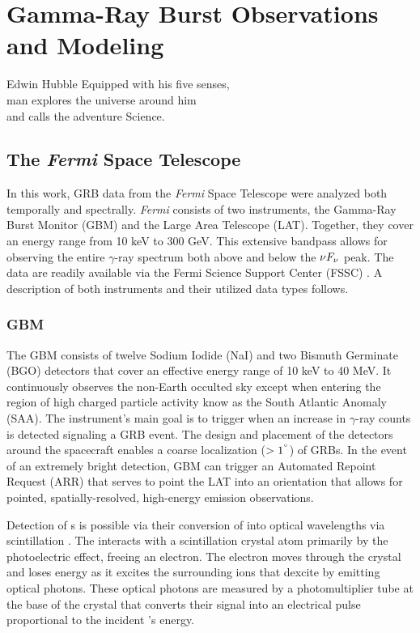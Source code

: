 \chapter{Gamma-Ray Burst Observations and Modeling}

\label{ch:obsGRB}
\begin{chapterquote}{Edwin Hubble}
  Equipped with his five senses,\\ man explores the universe around him\\
  and calls the adventure Science.
\end{chapterquote}

\section{The {\it Fermi} Space Telescope}
In this work, GRB data from the {\it Fermi} Space Telescope were
analyzed both temporally and spectrally. {\it Fermi} consists of two
instruments, the Gamma-Ray Burst Monitor (GBM) and the Large Area
Telescope (LAT). Together, they cover an energy range from 10 keV to
300 GeV. This extensive bandpass allows for observing the entire
$\gamma$-ray spectrum both above and below the $\nu F_{\nu}$ peak. The data
are readily available via the Fermi Science Support Center (FSSC)
\cite{fssc}. A description of both instruments and their utilized data
types follows.
\subsection{GBM}
The GBM consists of twelve Sodium Iodide (NaI) and two Bismuth
Germinate (BGO) detectors that cover an effective energy range of 10
keV to 40 MeV. It continuously observes the non-Earth occulted sky
except when entering the region of high charged particle activity know
as the South Atlantic Anomaly (SAA). The instrument's main goal is to
trigger when an increase in $\gamma$-ray counts is detected signaling
a GRB event. The design and placement of the detectors around the
spacecraft enables a coarse localization ($> 1^{\degree}$) of GRBs. In
the event of an extremely bright detection, GBM can trigger an
Automated Repoint Request (ARR) that serves to point the LAT into an
orientation that allows for pointed, spatially-resolved, high-energy
emission observations.

Detection of {\gray}s is possible via their conversion of into optical
wavelengths via scintillation \cite{knoll}. The {\gray} interacts with
a scintillation crystal atom primarily by the photoelectric
effect, freeing an electron. The electron moves through the crystal
and loses energy as it excites the surrounding ions that dexcite by
emitting optical photons. These optical photons are measured by a
photomultiplier tube at the base of the crystal that converts their
signal into an electrical pulse proportional to the incident \gray's
energy.


